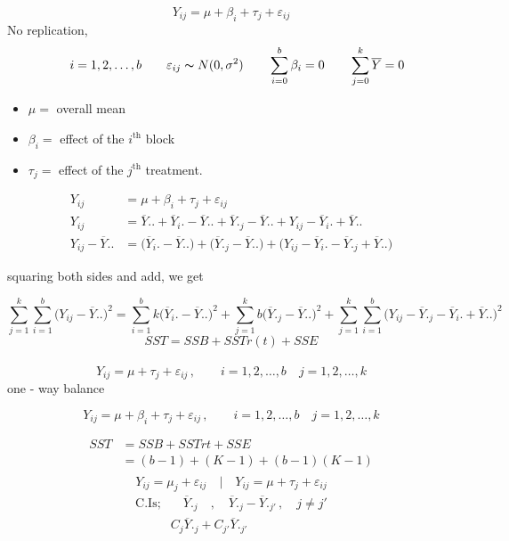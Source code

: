 \documentclass[11pt,a4paper]{article}
\theoremstyle{definition}
\begin{document}
$$Y_{ij} = \mu + \beta_i + \tau_j + \varepsilon_{ij}$$
No replication, $$\quad  i=1,2,\ldots ,b \qquad  \varepsilon_{ij} \thicksim N(0,\sigma^2)\qquad  \sum^b_{i=0} \beta_i=0\qquad  \sum^k_{j=0}\overline{Y}=0$$

\begin{itemize}
\item[] $\mu = $ overall mean
\item[] $\beta_i = $  effect of the $i^{\text{th}}$ block
\item[] $\tau_j = $ effect of the $j^{\text{th}}$ treatment.\\
\end{itemize}


\begin{align*}
Y_{ij} & = \mu + \beta_i + \tau_j + \varepsilon_{ij}\\
Y_{ij} & = \overline{Y}.. + \overline{Y}_i. - \overline{Y}.. + \overline{Y}._j-\overline{Y}.. + Y_{ij}-\overline{Y}_i. + \overline{Y}..\\
Y_{ij} - \overline{Y}.. & = \big(\overline{Y}_i.-\overline{Y}..\big) + \big(\overline{Y}._j-\overline{Y}..\big) + \big(Y_{ij}-\overline{Y}_i.-\overline{Y}._j+\overline{Y}..\big)
\end{align*}

squaring both sides and add, we get 

$$\sum^k_{j=1}\sum^b_{i=1}\big(Y_{ij}-\overline{Y}..\big)^2 = \sum^b_{i=1}k\big(\overline{Y}_i.-\overline{Y}..\big)^2 + \sum^k_{j=1} b\big(\overline{Y}._j-\overline{Y}..\big)^2 + \sum^k_{j=1}\sum^b_{i=1}\big(Y_{ij}-\overline{Y}._j-\overline{Y}_i.+\overline{Y}..\big)^2$$
$$SST = SSB + SSTr(t) + SSE$$\\


$$Y_{ij} = \mu + \tau_j + \varepsilon_{ij}\,, \qquad  i=1,2,\ldots ,b\quad  j=1,2,\ldots ,k$$
one - way balance

$$Y_{ij} = \mu + \beta_i + \tau_j + \varepsilon_{ij}\,,\qquad  i=1,2,\ldots ,b\quad  j=1,2,\ldots ,k$$



\begin{align*}
SST & = SSB + SSTrt + SSE\\
    & = (b-1) + (K-1) + (b-1)(K-1)\\
\end{align*}
$$Y_{ij} = \mu_j + \varepsilon_{ij}\quad   \Big|\quad  Y_{ij} = \mu + \tau_j + \varepsilon_{ij}$$
\begin{align*}
\text{C.Is};&\quad  \overline{Y}._j\quad , \quad  \overline{Y}._j-\overline{Y}._{j'}\, , \quad  j\neq j'\\
            & C_j \overline{Y}._j + C_{j'} \overline{Y}._{j'}\\
\end{align*}
\end{document}
